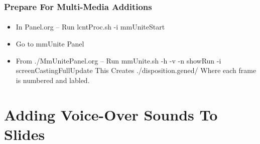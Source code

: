 \begin{comment}
*****  [[elisp:(org-cycle)][| ]]  [[elisp:(blee:ppmm:org-mode-toggle)][Nat]] [[elisp:(beginning-of-buffer)][Top]] [[elisp:(delete-other-windows)][(1)]] || /Frame/ *Label=PrepareForMulti-MediaAdditions*  Prepare For Multi-Media Additions ::  [[elisp:(org-cycle)][| ]]
\end{comment}

\begin{frame}[fragile,label=PrepareForMulti-MediaAdditions]
    \frametitle{Prepare For Multi-Media Additions}
    \framesubtitle{}

\begin{itemize}
\item In Panel.org -- Run  lcntProc.sh -i mmUniteStart 
\item Go to mmUnite Panel
\item From ./MmUnitePanel.org -- Run  mmUnite.sh -h -v -n showRun -i screenCastingFullUpdate
  This Creates ./disposition.gened/ Where each frame is numbered and labled.
\end{itemize}



\end{frame}


\begin{comment}
*  [[elisp:(org-cycle)][| ]] [[elisp:(org-show-subtree)][|=]] [[elisp:(show-children 10)][|V]] [[elisp:(bx:orgm:indirectBufOther)][|>]] [[elisp:(bx:orgm:indirectBufMain)][|I]] [[elisp:(blee:ppmm:org-mode-toggle)][|N]] [[elisp:(org-top-overview)][|O]] [[elisp:(progn (org-shifttab) (org-content))][|C]] [[elisp:(delete-other-windows)][|1]]  /Section/   Adding Voice-Over Sounds To Slides ::  [[elisp:(org-cycle)][| ]]
\end{comment}

\section{Adding Voice-Over Sounds To Slides}


